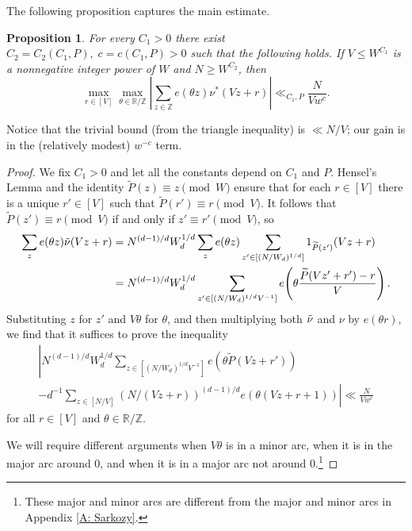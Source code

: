\documentclass[11pt]{amsart}
\newtheorem{proposition}[lemma]{Proposition}
\theoremstyle{definition}
\newcommand{\R}{{\mathbb R}}
\newcommand{\Z}{{\mathbb Z}}
\newcommand{\abs}[1]{\mathopen{}\left| #1\mathclose{}\right|}
\newcommand{\brac}[1]{\mathopen{}\left( #1 \mathclose{}\right)}
\begin{document}
The following proposition captures the main estimate.

\begin{proposition}\label{prop:nu-uniformity}
For every $C_1>0$ there exist $C_2 = C_2(C_1, P),\; c=c(C_1, P)>0$ such that the following holds. If $V\leq W^{C_1}$ is a nonnegative integer power of $W$ and $N\geq W^{C_2}$, then %
$$\max_{r\in[V]}\max_{\theta \in \mathbb{R}/\mathbb{Z}}\abs{\sum_{z \in \mathbb{Z}}e(\theta z)\nu^*(Vz+r)} \ll_{C_1,P} \frac{N}{V w^c}.$$

\end{proposition}
Notice that the trivial bound (from the triangle inequality) is $\ll N/V$; our gain is in the (relatively modest) $w^{-c}$ term.

\begin{proof}
We fix $C_1>0$ and let all the constants depend on $C_1$ and $P$.
Hensel's Lemma and the identity $\widetilde P(z) \equiv z \!\!\pmod{W}$ ensure that for each $r\in[V]$ there is a unique $r'\in[V]$ such that $\widetilde P(r') \equiv r \!\!\pmod{V}$. It follows that $\widetilde P(z') \equiv r \!\!\pmod{V}$ if and only if $z'\equiv r' \!\!\pmod{V}$, so
\begin{align*}
    \sum_{z}e(\theta z) \Tilde{\nu}(Vz+r) &=  N^{(d-1)/d}W_d^{1/d} \sum_z e(\theta z)\sum_{z' \in [(N/W_d)^{1/d}]}1_{\widetilde P(z')}(Vz+r)\\
    &= N^{(d-1)/d}W_d^{1/d} \sum_{z' \in [(N/W_d)^{1/d}V^{-1}]}e\brac{\theta \frac{\widetilde P(Vz'+r')-r}{V}}.
\end{align*}
Substituting $z$ for $z'$ and $V\theta$ for $\theta$, and then multiplying both $\Tilde{\nu}$ and $\nu$ by $e(\theta r)$, we find that it suffices to prove the inequality
\begin{multline*}
 \left|N^{(d-1)/d}W_d^{1/d} \sum_{z \in [(N/W_d)^{1/d}V^{-1}]}e(\theta \widetilde P(Vz+r'))\right.\\
 \left.-d^{-1}\sum_{z \in [N/V]} (N/(Vz+r))^{(d-1)/d}e(\theta (V z+r+1))\right|\ll \frac{N}{V w^c}   
\end{multline*}
for all $r \in [V]$ and $\theta\in\R/\Z$. 



We will require different arguments when $V\theta$ is in a minor arc, when it is in the major arc around $0$, and when it is in a major arc not around $0$.\footnote{These major and minor arcs are different from the major and minor arcs in Appendix \ref{A: Sarkozy}.}



\end{proof}
\end{document}
